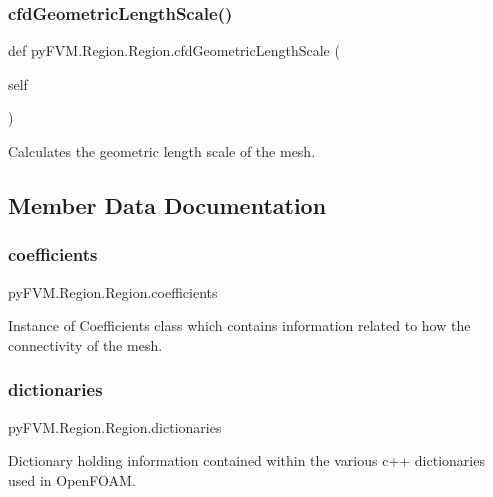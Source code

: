 \subsubsection{\texorpdfstring{cfdGeometricLengthScale()}{cfdGeometricLengthScale()}}
{\footnotesize\ttfamily def py\+F\+V\+M.\+Region.\+Region.\+cfd\+Geometric\+Length\+Scale (\begin{DoxyParamCaption}\item[{}]{self }\end{DoxyParamCaption})}

\begin{DoxyVerb}Calculates the geometric length scale of the mesh. 
\end{DoxyVerb}
 

\subsection{Member Data Documentation}
\mbox{\label{classpy_f_v_m_1_1_region_1_1_region_a6f91d0e074a2b28b8ed05a00a37cb4f3}} 
\subsubsection{\texorpdfstring{coefficients}{coefficients}}
{\footnotesize\ttfamily py\+F\+V\+M.\+Region.\+Region.\+coefficients}



Instance of Coefficients class which contains information related to how the connectivity of the mesh. 

\mbox{\label{classpy_f_v_m_1_1_region_1_1_region_addeb33384d08febd9d7ed462c1e93bed}} 
\subsubsection{\texorpdfstring{dictionaries}{dictionaries}}
{\footnotesize\ttfamily py\+F\+V\+M.\+Region.\+Region.\+dictionaries}



Dictionary holding information contained within the various c++ dictionaries used in Open\+F\+O\+AM. 

